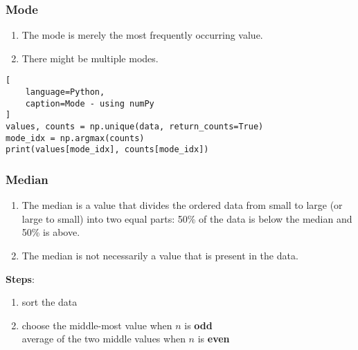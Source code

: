 \subsubsection{Mode \cite{statistics/book/Statistics-for-Data-Scientists/Maurits-Kaptein}} \label{Data/Describing Data/Central Tendency/Mode}

\begin{enumerate}
    \item The mode is merely the most frequently occurring value. \hfill \cite{statistics/book/Statistics-for-Data-Scientists/Maurits-Kaptein}

    \item There might be multiple modes. \hfill \cite{statistics/book/Statistics-for-Data-Scientists/Maurits-Kaptein}

\end{enumerate}

\begin{lstlisting}[
    language=Python,
    caption=Mode - using numPy
]
values, counts = np.unique(data, return_counts=True)
mode_idx = np.argmax(counts)
print(values[mode_idx], counts[mode_idx])
\end{lstlisting}



\subsubsection{Median \cite{statistics/book/Statistics-for-Data-Scientists/Maurits-Kaptein}} \label{Data/Describing Data/Central Tendency/Median}

\begin{enumerate}
    \item The median is a value that divides the ordered data from small to large (or large to small) into two equal parts: 50\% of the data is below the median and 50\% is above.  \hfill \cite{statistics/book/Statistics-for-Data-Scientists/Maurits-Kaptein}

    \item The median is not necessarily a value that is present in the data. \hfill \cite{statistics/book/Statistics-for-Data-Scientists/Maurits-Kaptein}
\end{enumerate}


\vspace{0.3cm}
\textbf{Steps}: \hfill \cite{statistics/book/Statistics-for-Data-Scientists/Maurits-Kaptein}
\begin{enumerate}
    \item sort the data

    \item choose the middle-most value when $n$ is \textbf{odd}\\
        average of the two middle values when $n$ is \textbf{even}
\end{enumerate}



